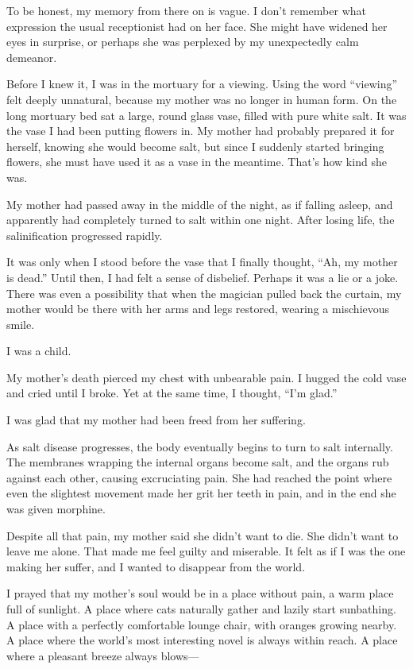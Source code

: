 \documentclass[
    a4paper,
    12pt,
    twoside,
    openany,
    UTF8,
    fontset=windows
]{ctexbook}
\begin{document}
To be honest, my memory from there on is vague. I don't remember what expression the usual receptionist had on her face. She might have widened her eyes in surprise, or perhaps she was perplexed by my unexpectedly calm demeanor.

Before I knew it, I was in the mortuary for a viewing. Using the word ``viewing'' felt deeply unnatural, because my mother was no longer in human form. On the long mortuary bed sat a large, round glass vase, filled with pure white salt. It was the vase I had been putting flowers in. My mother had probably prepared it for herself, knowing she would become salt, but since I suddenly started bringing flowers, she must have used it as a vase in the meantime. That's how kind she was.

My mother had passed away in the middle of the night, as if falling asleep, and apparently had completely turned to salt within one night. After losing life, the salinification progressed rapidly.

It was only when I stood before the vase that I finally thought, ``Ah, my mother is dead.'' Until then, I had felt a sense of disbelief. Perhaps it was a lie or a joke. There was even a possibility that when the magician pulled back the curtain, my mother would be there with her arms and legs restored, wearing a mischievous smile.

I was a child.

My mother's death pierced my chest with unbearable pain. I hugged the cold vase and cried until I broke. Yet at the same time, I thought, ``I'm glad.''

I was glad that my mother had been freed from her suffering.

As salt disease progresses, the body eventually begins to turn to salt internally. The membranes wrapping the internal organs become salt, and the organs rub against each other, causing excruciating pain. She had reached the point where even the slightest movement made her grit her teeth in pain, and in the end she was given morphine.

Despite all that pain, my mother said she didn't want to die. She didn't want to leave me alone. That made me feel guilty and miserable. It felt as if I was the one making her suffer, and I wanted to disappear from the world.

I prayed that my mother's soul would be in a place without pain, a warm place full of sunlight. A place where cats naturally gather and lazily start sunbathing. A place with a perfectly comfortable lounge chair, with oranges growing nearby. A place where the world's most interesting novel is always within reach. A place where a pleasant breeze always blows---
\end{document}

